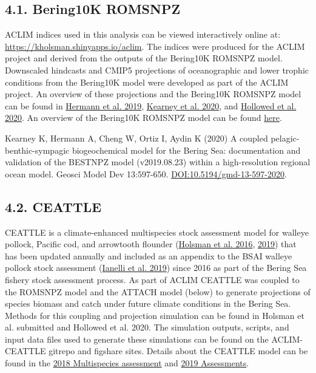 \documentclass[]{article}
\begin{document}
\subsection{4.1. Bering10K ROMSNPZ}\label{bering10k-romsnpz}

ACLIM indices used in this analysis can be viewed interactively online
at: \url{https://kholsman.shinyapps.io/aclim}. The indices were produced
for the ACLIM project and derived from the outputs of the Bering10K
ROMSNPZ model. Downscaled hindcasts and CMIP5 projections of
oceanographic and lower trophic conditions from the Bering10K model were
developed as part of the ACLIM project. An overview of these projections
and the Bering10K ROMSNPZ model can be found in
\href{\%22https://academic.oup.com/icesjms/article/76/5/1280/5477847\%22}{Hermann
et al. 2019},
\href{\%22https://gmd.copernicus.org/articles/13/597/2020/\%22}{Kearney
et al. 2020}, and
\href{\%22https://www.frontiersin.org/articles/10.3389/fmars.2019.00775/full\%22}{Hollowed
et al. 2020}. An overview of the Bering10K ROMSNPZ model can be found
\href{\%22https://beringnpz.github.io/roms-bering-sea/intro/\%22}{here}.

Kearney K, Hermann A, Cheng W, Ortiz I, Aydin K (2020) A coupled
pelagic-benthic-sympagic biogeochemical model for the Bering Sea:
documentation and validation of the BESTNPZ model (v2019.08.23) within a
high-resolution regional ocean model. Geosci Model Dev 13:597-650.
\url{DOI:10.5194/gmd-13-597-2020}.

\subsection{4.2. CEATTLE}\label{ceattle}

CEATTLE is a climate-enhanced multispecies stock assessment model for
walleye pollock, Pacific cod, and arrowtooth flounder
(\href{\%22https://www.sciencedirect.com/science/article/pii/S0967064515002751\%22}{Holsman
et al. 2016},
\href{\%22https://archive.afsc.noaa.gov/refm/docs/2019/EBSmultispp.pdf\%22}{2019})
that has been updated annually and included as an appendix to the BSAI
walleye pollock stock assessment
(\href{\%22https://archive.afsc.noaa.gov/refm/docs/2019/GOApollock.pdf\%22}{Ianelli
et al. 2019}) since 2016 as part of the Bering Sea fishery stock
assessment process. As part of ACLIM CEATTLE was coupled to the ROMSNPZ
model and the ATTACH model (below) to generate projections of species
biomass and catch under future climate conditions in the Bering Sea.
Methods for this coupling and projection simulation can be found in
Holsman et al. submitted and Hollowed et al. 2020. The simulation
outputs, scripts, and input data files used to generate these
simulations can be found on the ACLIM-CEATTLE gitrepo and figshare
sites. Details about the CEATTLE model can be found in the
\href{\%22https://archive.fisheries.noaa.gov/afsc/REFM/Docs/2018/BSAI/2018EBSmultispp-508.pdf\%22}{2018
Multispecies assessment} and
\href{\%22https://archive.afsc.noaa.gov/refm/docs/2019/EBSmultispp.pdf\%22}{2019
Assessments}.
\end{document}
